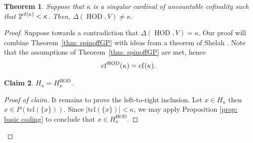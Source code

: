 \documentclass[11pt]{amsart}
\newtheorem{theorem}{Theorem}[section]
\newtheorem{claim}[theorem]{Claim}
\theoremstyle{definition}
\theoremstyle{remark}
\DeclareMathOperator{\HOD}{HOD}
\newcommand{\cf}{{\rm cf}}
\newcommand\tom[1]{\marginpar{Tom: #1}}
\newcommand\ale[1]{\marginpar{Alejandro: #1}}
\begin{document}
\begin{theorem}\label{thm: compactness}
    Suppose that   $\kappa$ is a singular cardinal  of uncountable cofinality such that   $2^{\cf(\kappa)}<\kappa$. Then,   $\Delta(\HOD,V)\neq \kappa$.
\end{theorem}
\begin{proof}
   Suppose towards a contradiction that  $\Delta(\HOD, V)=\kappa$. Our proof will combine Theorem~\ref{thm: spinoffGP} with ideas from a theorem of Shelah \cite{ShelahHOD}. Note that the assumptions of Theorem~\ref{thm: spinoffGP} are met, hence $$\cf^{\HOD}(\kappa)=\cf(\kappa).$$
   
   

 
   \begin{claim}
       $H_\kappa=H_{\kappa}^{\HOD}$.
   \end{claim}%
   \begin{proof}[Proof of claim]
      It remains to prove the left-to-right inclusion. Let $x\in H_\kappa$ then $x\in P(\mathrm{tcl}(\{x\}))$. Since $|\mathrm{tcl}(\{x\})|<\kappa$, we may apply Proposition \ref{prop: basic coding} to conclude that $x\in H_\kappa^{\HOD}$.
   \end{proof}




\end{proof}
\end{document}
